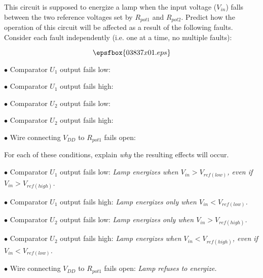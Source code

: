 

This circuit is supposed to energize a lamp when the input voltage ($V_{in}$) falls between the two reference voltages set by $R_{pot1}$ and $R_{pot2}$.  Predict how the operation of this circuit will be affected as a result of the following faults.  Consider each fault independently (i.e. one at a time, no multiple faults):

$$\epsfbox{03837x01.eps}$$

\medskip
\item{$\bullet$} Comparator $U_1$ output fails low:
\vskip 5pt
\item{$\bullet$} Comparator $U_1$ output fails high:
\vskip 5pt
\item{$\bullet$} Comparator $U_2$ output fails low:
\vskip 5pt
\item{$\bullet$} Comparator $U_2$ output fails high:
\vskip 5pt
\item{$\bullet$} Wire connecting $V_{DD}$ to $R_{pot1}$ fails open:
\medskip

For each of these conditions, explain {\it why} the resulting effects will occur.







\medskip
\item{$\bullet$} Comparator $U_1$ output fails low: {\it Lamp energizes when $V_{in} > V_{ref(low)}$, even if $V_{in} > V_{ref(high)}$.}
\vskip 5pt
\item{$\bullet$} Comparator $U_1$ output fails high: {\it Lamp energizes only when $V_{in} < V_{ref(low)}$.}
\vskip 5pt
\item{$\bullet$} Comparator $U_2$ output fails low: {\it Lamp energizes only when $V_{in} > V_{ref(high)}$.}
\vskip 5pt
\item{$\bullet$} Comparator $U_2$ output fails high: {\it Lamp energizes when $V_{in} < V_{ref(high)}$, even if $V_{in} < V_{ref(low)}$.}
\vskip 5pt
\item{$\bullet$} Wire connecting $V_{DD}$ to $R_{pot1}$ fails open: {\it Lamp refuses to energize.}
\medskip






